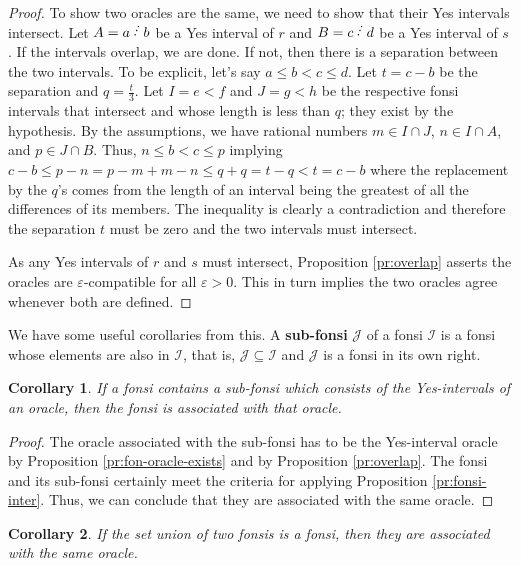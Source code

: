 \documentclass[12pt]{article}
\newtheorem{corollary}{Corollary}[subsection]
\begin{document}
\begin{proof}
To show two oracles are the same, we need to show that their Yes intervals intersect. Let $A=a\lte b$ be a Yes interval of $r$ and $B=c \lte d$ be a Yes interval of $s$. If the intervals overlap, we are done. If not, then there is a separation between the two intervals. To be explicit, let's say $a \leq b < c \leq d$. Let $t = c-b$ be the separation and $q = \frac{t}{3}$. Let $I= e\lt f$ and $J= g \lt h$ be the respective fonsi intervals that intersect and whose length is less than $q$;  they exist by the hypothesis. By the assumptions, we have rational numbers $m \in I \cap J$, $n \in I \cap A$, and $p \in J \cap B$. Thus,  $n \leq b < c \leq p$ implying $c-b \leq p - n  = p-m + m-n \leq q + q = t - q < t = c-b$ where the replacement by the $q$'s comes from the length of an interval being the greatest of all the differences of its members. The inequality is clearly a contradiction and therefore the separation $t$ must be zero and the two intervals must intersect. 
 
As any Yes intervals of $r$ and $s$ must intersect, Proposition \ref{pr:overlap} asserts the oracles are $\varepsilon$-compatible for all $\varepsilon >0$. This in turn implies the two oracles agree whenever both are defined. 
\end{proof}

We have some useful corollaries from this. A \textbf{sub-fonsi} $\mathcal{J}$ of a fonsi $\mathcal{I}$ is a fonsi whose elements are also in $\mathcal{I}$, that is, $\mathcal{J} \subseteq \mathcal{I}$ and $\mathcal{J}$ is a fonsi in its own right.  

\begin{corollary}\label{cor:sub-fonsi}
    If a fonsi contains a sub-fonsi which consists of the Yes-intervals of an oracle, then the fonsi is associated with that oracle. 
\end{corollary}

\begin{proof}
    The oracle associated with the sub-fonsi has to be the Yes-interval oracle by Proposition \ref{pr:fon-oracle-exists} and by Proposition \ref{pr:overlap}. The fonsi and its sub-fonsi certainly meet the criteria for applying Proposition \ref{pr:fonsi-inter}. Thus, we can conclude that they are associated with the same oracle. 
\end{proof}

\begin{corollary}
    If the set union of two fonsis is a fonsi, then they are associated with the same oracle.
\end{corollary}
\end{document}
